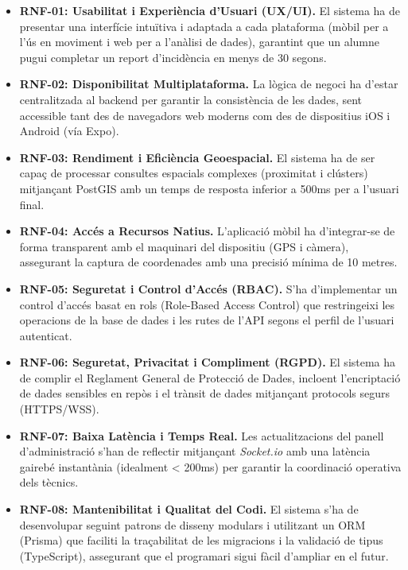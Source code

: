 \begin{itemize}
	
	\item \textbf{RNF-01: Usabilitat i Experiència d'Usuari (UX/UI).} El sistema ha de presentar una interfície intuïtiva i adaptada a cada plataforma (mòbil per a l'ús en moviment i web per a l'anàlisi de dades), garantint que un alumne pugui completar un report d'incidència en menys de 30 segons.
	
	\item \textbf{RNF-02: Disponibilitat Multiplataforma.} La lògica de negoci ha d'estar centralitzada al backend per garantir la consistència de les dades, sent accessible tant des de navegadors web moderns com des de dispositius iOS i Android (vía Expo).
	
	\item \textbf{RNF-03: Rendiment i Eficiència Geoespacial.} El sistema ha de ser capaç de processar consultes espacials complexes (proximitat i clústers) mitjançant PostGIS amb un temps de resposta inferior a 500ms per a l'usuari final.
	
	\item \textbf{RNF-04: Accés a Recursos Natius.} L'aplicació mòbil ha d'integrar-se de forma transparent amb el maquinari del dispositiu (GPS i càmera), assegurant la captura de coordenades amb una precisió mínima de 10 metres.
	
	\item \textbf{RNF-05: Seguretat i Control d'Accés (RBAC).} S'ha d'implementar un control d'accés basat en rols (Role-Based Access Control) que restringeixi les operacions de la base de dades i les rutes de l'API segons el perfil de l'usuari autenticat.
	
	\item \textbf{RNF-06: Seguretat, Privacitat i Compliment (RGPD).} El sistema ha de complir el Reglament General de Protecció de Dades, incloent l'encriptació de dades sensibles en repòs i el trànsit de dades mitjançant protocols segurs (HTTPS/WSS).
	
	\item \textbf{RNF-07: Baixa Latència i Temps Real.} Les actualitzacions del panell d'administració s'han de reflectir mitjançant \textit{Socket.io} amb una latència gairebé instantània (idealment < 200ms) per garantir la coordinació operativa dels tècnics.
	
	\item \textbf{RNF-08: Mantenibilitat i Qualitat del Codi.} El sistema s'ha de desenvolupar seguint patrons de disseny modulars i utilitzant un ORM (Prisma) que faciliti la traçabilitat de les migracions i la validació de tipus (TypeScript), assegurant que el programari sigui fàcil d'ampliar en el futur.
	
\end{itemize}
